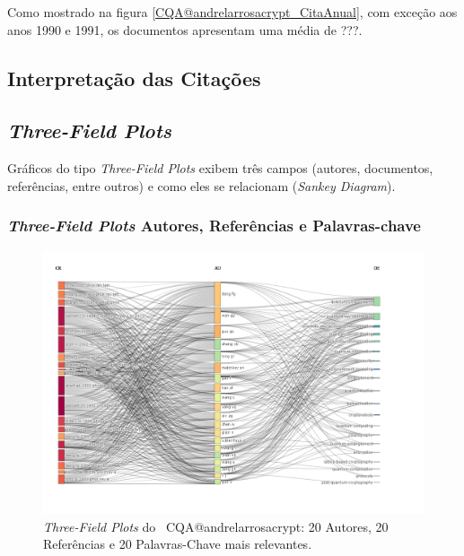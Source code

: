 
Como mostrado na figura \ref{CQA@andrelarrosacrypt_CitaAnual}, com exceção aos anos 1990 e 1991, os documentos apresentam uma média de ???.


\subsection{Interpretação das Citações}






\subsection{\textit{Three-Field Plots}}

Gráficos do tipo \textit{Three-Field Plots} exibem três campos (autores, documentos, referências, entre outros) e como eles se relacionam (\textit{Sankey Diagram}).

\subsubsection{\textit{Three-Field Plots} Autores, Referências e Palavras-chave}

\begin{figure}
    \centering
    \includegraphics[angle=0,width=1\textwidth]{experiments/andrelarrosacrypt/AnaliseBibliometrica/CriptografiaQuantica/imagens/CQA@andrelarrosacrypt_Aut_Ref_Key.png}
    \caption{\textit{Three-Field Plots} do \dataset\ CQA@andrelarrosacrypt: 20 Autores, 20 Referências e 20 Palavras-Chave mais relevantes.}
    \label{CQA@andrelarrosacrypt_Aut_Ref_Key}
\end{figure}

